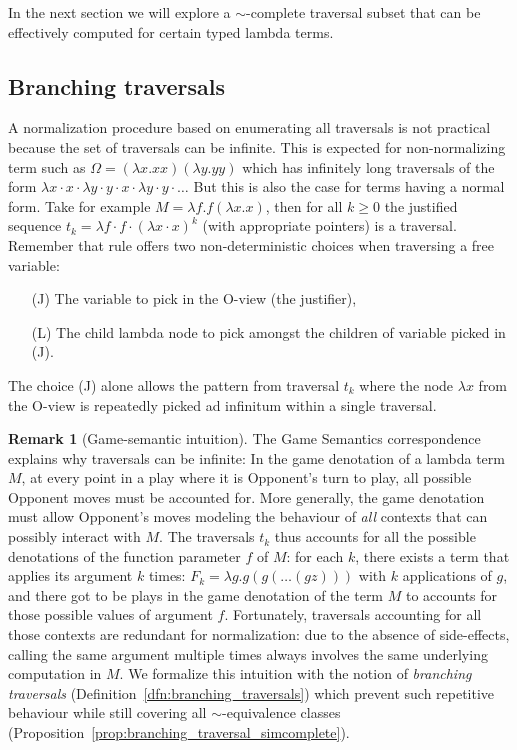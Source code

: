\documentclass{article}
\theoremstyle{definition}
\newtheorem{remark}{Remark}[section]
\begin{document}
In the next section we will explore a $\sim$-complete traversal subset that can be effectively computed for certain typed lambda terms.

\subsection{Branching traversals}

A normalization procedure based on enumerating all traversals is not practical because the set of traversals can be infinite. This is expected for non-normalizing term such as $\Omega = (\lambda x. x x)(\lambda y. y y)$ which has infinitely long traversals of the form $\lambda x \cdot x \cdot \lambda y \cdot y \cdot x \cdot \lambda y \cdot y \cdot \ldots$ But this is also the case for terms having a normal form. Take for example $M = \lambda f . f (\lambda x. x)$, then for all $k\geq0$ the justified sequence $t_k = \lambda f \cdot f \cdot (\lambda x \cdot  x)^k$ (with appropriate pointers) is a traversal.
Remember that rule  offers two non-deterministic choices when traversing a free variable:
\begin{itemize}
\item[(J)] The variable to pick in the O-view (the justifier),
\item[(L)] The child lambda node to pick amongst the children of variable picked in (J).
\end{itemize}
The choice (J) alone allows the pattern from traversal $t_k$ where the node $\lambda x$ from the O-view is repeatedly picked ad infinitum within a single traversal.

\begin{remark}[Game-semantic intuition]
The Game Semantics correspondence explains why traversals can be infinite: In the game denotation of a lambda term $M$, at every point in a play where it is Opponent's turn to play, all possible Opponent moves must be accounted for. More generally, the game denotation must allow Opponent's moves modeling the behaviour of \emph{all} contexts that can possibly interact with $M$. The traversals $t_k$ thus accounts for all the possible denotations of the function parameter $f$ of $M$: for each $k$, there exists a term that applies its argument $k$ times: $F_k = \lambda g . g (g ( \ldots (g z)))$ with $k$ applications of $g$, and there got to be plays in the game denotation of the term $M$ to accounts for those possible values of argument $f$. Fortunately, traversals accounting for all those contexts are redundant for normalization: due to the absence of side-effects, calling the same argument multiple times always involves the same underlying computation in $M$. We formalize this intuition with the notion of \emph{branching traversals} (Definition~\ref{dfn:branching_traversals})  which prevent such repetitive behaviour while still covering all $\sim$-equivalence classes (Proposition~\ref{prop:branching_traversal_simcomplete}).
\end{remark}
\end{document}
